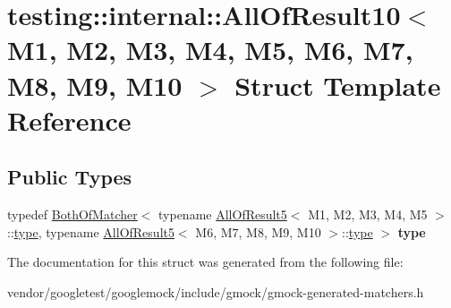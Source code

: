 \hypertarget{structtesting_1_1internal_1_1_all_of_result10}{}\section{testing\+:\+:internal\+:\+:All\+Of\+Result10$<$ M1, M2, M3, M4, M5, M6, M7, M8, M9, M10 $>$ Struct Template Reference}
\label{structtesting_1_1internal_1_1_all_of_result10}
\subsection*{Public Types}
\begin{DoxyCompactItemize}
\item 
\mbox{\label{structtesting_1_1internal_1_1_all_of_result10_a48d6c6de6d0d5445b212119e1f536af5}} 
typedef \mbox{\hyperlink{classtesting_1_1internal_1_1_both_of_matcher}{Both\+Of\+Matcher}}$<$ typename \mbox{\hyperlink{structtesting_1_1internal_1_1_all_of_result5}{All\+Of\+Result5}}$<$ M1, M2, M3, M4, M5 $>$\+::\mbox{\hyperlink{classtesting_1_1internal_1_1_both_of_matcher}{type}}, typename \mbox{\hyperlink{structtesting_1_1internal_1_1_all_of_result5}{All\+Of\+Result5}}$<$ M6, M7, M8, M9, M10 $>$\+::\mbox{\hyperlink{classtesting_1_1internal_1_1_both_of_matcher}{type}} $>$ {\bfseries type}
\end{DoxyCompactItemize}


The documentation for this struct was generated from the following file\+:\begin{DoxyCompactItemize}
\item 
vendor/googletest/googlemock/include/gmock/gmock-\/generated-\/matchers.\+h\end{DoxyCompactItemize}
